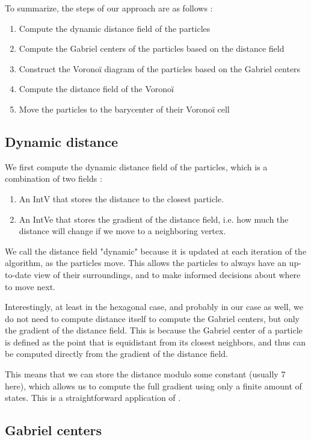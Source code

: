 \documentclass[11pt,a4paper]{report}
\begin{document}
To summarize, the steps of our approach are as follows :
\begin{enumerate}
    \item Compute the dynamic distance field of the particles
    \item Compute the Gabriel centers of the particles based on the distance field
    \item Construct the Voronoï diagram of the particles based on the Gabriel centers
    \item Compute the distance field of the Voronoï
    \item Move the particles to the barycenter of their Voronoï cell
\end{enumerate}

\subsection{Dynamic distance}
\label{sec:distance}

We first compute the dynamic distance field of the particles, which is a combination of two fields : 
\begin{enumerate}
    \item An IntV that stores the distance to the closest particle.
    \item An IntVe that stores the gradient of the distance field, i.e. how much the distance will change if we move to a neighboring vertex.
\end{enumerate}

We call the distance field "dynamic" because it is updated at each iteration of the algorithm, as the particles move. This allows the particles to always have an up-to-date view of their surroundings, and to make informed decisions about where to move next.

Interestingly, at least in the hexagonal case, and probably in our case as well, we do not need to compute distance itself to compute the Gabriel centers, but only the gradient of the distance field. This is because the Gabriel center of a particle is defined as the point that is equidistant from its closest neighbors, and thus can be computed directly from the gradient of the distance field.

This means that we can store the distance modulo some constant (usually 7 here), which allows us to compute the full gradient using only a finite amount of states. This is a straightforward application of \cite{distancegradient}.

\subsection{Gabriel centers}
\label{sec:gabriel}
\end{document}
